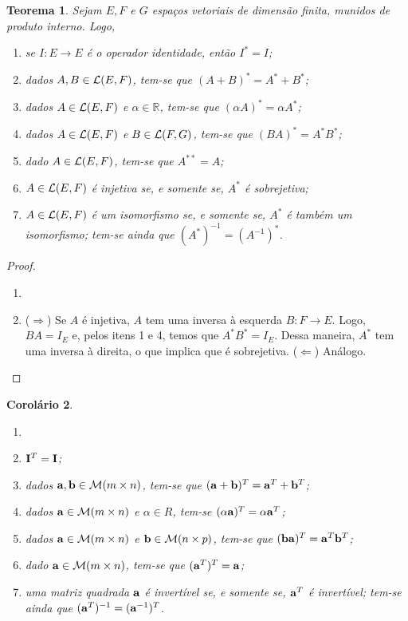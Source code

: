 \documentclass[12pt,a4paper]{article}
\newcommand{\R}{\mathbb{R}}
\newtheorem{thm}{Teorema}[section]
\newtheorem{cor}[thm]{Corolário}
\theoremstyle{definition}
\begin{document}
\begin{thm}
  Sejam $E,F$ e $G$ espaços vetoriais de dimensão finita, munidos de
  produto interno. Logo,
  \begin{enumerate}
  \item se $I:E\to E$ é o operador identidade, então $I^*=I$;
  \item dados $A,B\in{\cal L}(E,F)$, tem-se que $(A+B)^*=A^*+B^*$;
  \item dados $A\in{\cal L}(E,F)$ e $\alpha\in\R$, tem-se que
    $(\alpha A)^*=\alpha A^*$;
  \item dados $A\in{\cal L}(E,F)$ e $B\in{\cal L}(F,G)$, tem-se que
    $(BA)^*=A^*B^*$;
  \item dado $A\in{\cal L}(E,F)$, tem-se que $A^{**}=A$;
  \item $A\in{\cal L}(E,F)$ é injetiva se, e somente se, $A^*$ é
    sobrejetiva;
  \item $A\in{\cal L}(E,F)$ é um isomorfismo se, e somente se, $A^*$ é
    também um isomorfismo; tem-se ainda que $(A^*)^{-1}=(A^{-1})^*$.
  \end{enumerate}
\end{thm}
\begin{proof}
  \begin{enumerate}
  \item[]
  \item[6.] ($\Rightarrow$) Se $A$ é injetiva, $A$ tem uma inversa à
    esquerda $B:F\to E$. Logo, $BA=I_E$ e, pelos itens 1 e 4, temos
    que $A^*B^*=I_E$. Dessa maneira, $A^*$ tem uma inversa à direita,
    o que implica que é sobrejetiva. ($\Leftarrow$) Análogo.\qedhere
  \end{enumerate}
\end{proof}

\begin{cor}
  \begin{enumerate}
  \item[]
  \item ${\bf I}^T={\bf I}$;
  \item dados ${\bf a}, {\bf b}\in {\cal M}(m\times n)$, tem-se que
    $({\bf a}+{\bf b})^T={\bf a}^T+{\bf b}^T$;
  \item dados ${\bf a}\in {\cal M}(m\times n)$ e $\alpha\in R$, tem-se
    $(\alpha{\bf a})^T=\alpha{\bf a}^T$;
  \item dados ${\bf a}\in {\cal M}(m\times n)$ e
    ${\bf b}\in{\cal M}(n\times p)$, tem-se que
    $({\bf ba})^T={\bf a}^T{\bf b}^T$;
  \item dado ${\bf a}\in{\cal M}(m\times n)$, tem-se que
    $({\bf a}^{T})^T={\bf a}$;
  \item uma matriz quadrada ${\bf a}$ é invertível se, e somente se,
    ${\bf a}^T$ é invertível; tem-se ainda que
    $({\bf a}^T)^{-1}=({\bf a}^{-1})^T$.
  \end{enumerate}
\end{cor}
\end{document}

